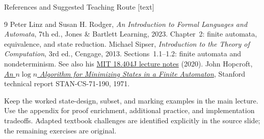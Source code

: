 \documentclass[10pt]{beamer}
\begin{document}
\begin{frame}{References and Suggested Teaching Route}
  \footnotesize
  [text]
  \begin{thebibliography}{9}
      Peter Linz and Susan H. Rodger,
      \emph{An Introduction to Formal Languages and Automata}, 7th ed.,
      Jones \& Bartlett Learning, 2023. Chapter~2: finite automata,
      equivalence, and state reduction.
      Michael Sipser, \emph{Introduction to the Theory of Computation},
      3rd ed., Cengage, 2013. Sections~1.1--1.2: finite automata and
      nondeterminism. See also his
      \href{https://ocw.mit.edu/courses/18-404j-theory-of-computation-fall-2020/pages/lecture-notes/}
      {MIT 18.404J lecture notes} (2020).
      John Hopcroft,
      \href{https://www.cs.cmu.edu/~cdm/resources/Hopcroft1971.pdf}
      {\emph{An $n\log n$ Algorithm for Minimizing States in a Finite Automaton}},
      Stanford technical report STAN-CS-71-190, 1971.
  \end{thebibliography}
  Keep the worked state-design, subset, and marking examples in the main
  lecture. Use the appendix for proof enrichment, additional practice,
  and implementation tradeoffs. Adapted textbook challenges are identified
  explicitly in the source slide; the remaining exercises are original.
\end{frame}
\end{document}
